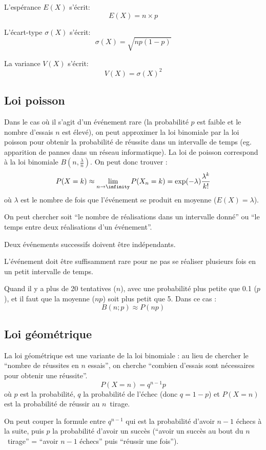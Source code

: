 \documentclass[10pt,a4paper,french]{article}
\begin{document}
L'espérance $E(X)$ s'écrit: \[E(X)=n \times p\]

L'écart-type $\sigma(X)$ s'écrit: \[\sigma(X)=\sqrt{np(1-p)}\]

La variance $V(X)$ s'écrit: \[V(X) = \sigma(X)^2\]

\subsection{Loi poisson}
Dans le cas où il s'agit d'un événement rare (la probabilité $p$ est faible et le nombre d'essais $n$ est élevé), on peut approximer la loi binomiale par la loi poisson pour obtenir la probabilité de réussite dans un intervalle de temps (eg. apparition de pannes dans un réseau informatique). La loi de poisson correspond à la loi binomiale $B(n, \frac{\lambda}{n})$. On peut donc trouver :
\[
P(X = k) \approx \lim_{n \to \infinity} P(X_n = k) = \exp(-\lambda) \frac{\lambda^k}{k!}
\] où $\lambda$ est le nombre de fois que l'événement se produit en moyenne ($E(X) = \lambda$).

On peut chercher soit ``le nombre de réalisations dans un intervalle donné'' ou ``le temps entre deux réalisations d'un événement''.

Deux événements successifs doivent être indépendants.

L'événement doit être suffisamment rare pour ne pas se réaliser plusieurs fois en un petit intervalle de temps.

Quand il y a plus de 20 tentatives ($n$), avec une probabilité plus petite que 0.1 ($p$), et il faut que la moyenne ($np$) soit plus petit que 5. Dans ce cas : \[B(n; p) \approx P(np)\]

\subsection{Loi géométrique}

La loi géométrique est une variante de la loi binomiale : au lieu de chercher le ``nombre de réussites en $n$ essais'', on cherche ``combien d'essais sont nécessaires pour obtenir une réussite''.
\[
P(X = n) = q^{n-1} p
\] où $p$ est la probabilité, $q$ la probabilité de l'échec (donc $q = 1-p$) et $P(X = n)$ est la probabilité de réussir au $n$\ieme~tirage.

On peut couper la formule entre $q^{n-1}$ qui est la probabilité d'avoir $n-1$ échecs à la suite, puis $p$ la probabilité d'avoir un succès (``avoir un succès au bout du $n$\ieme~tirage'' = ``avoir $n-1$ échecs'' puis ``réussir une fois'').
\end{document}
